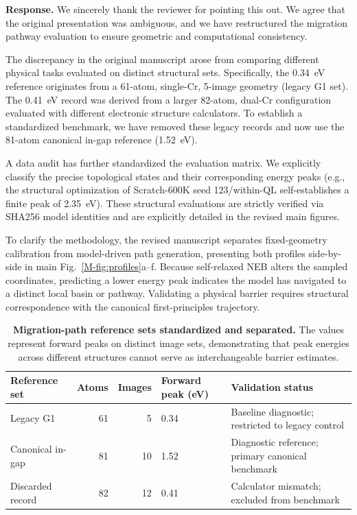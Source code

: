 \documentclass[11pt]{article}
\begin{document}
\textbf{Response.} 
We sincerely thank the reviewer for pointing this out. We agree that the original presentation was ambiguous, and we have restructured the migration pathway evaluation to ensure geometric and computational consistency. 

The discrepancy in the original manuscript arose from comparing different physical tasks evaluated on distinct structural sets. Specifically, the 0.34~eV reference originates from a 61-atom, single-Cr, 5-image geometry (legacy G1 set). The 0.41~eV record was derived from a larger 82-atom, dual-Cr configuration evaluated with different electronic structure calculators. To establish a standardized benchmark, we have removed these legacy records and now use the 81-atom canonical in-gap reference (1.52~eV).

A data audit has further standardized the evaluation matrix. We explicitly classify the precise topological states and their corresponding energy peaks (e.g., the structural optimization of Scratch-600K seed 123/within-QL self-establishes a finite peak of 2.35~eV). These structural evaluations are strictly verified via SHA256 model identities and are explicitly detailed in the revised main figures.

To clarify the methodology, the revised manuscript separates fixed-geometry calibration from model-driven path generation, presenting both profiles side-by-side in main Fig.~\ref{M-fig:profiles}a--f. Because self-relaxed NEB alters the sampled coordinates, predicting a lower energy peak indicates the model has navigated to a distinct local basin or pathway. Validating a physical barrier requires structural correspondence with the canonical first-principles trajectory.

\begin{table}[!htbp]
\centering\small
\caption{\textbf{Migration-path reference sets standardized and separated.} The values represent forward peaks on distinct image sets, demonstrating that peak energies across different structures cannot serve as interchangeable barrier estimates.}
\label{tab:resp-a1-reference-sets}
\setlength{\tabcolsep}{3pt}
\begin{tabular}{lrrll}
\toprule
Reference set & Atoms & Images & Forward peak (eV) & Validation status \\
\midrule
Legacy G1 & 61 & 5 & 0.34 & Baseline diagnostic; restricted to legacy control \\
Canonical in-gap & 81 & 10 & 1.52 & Diagnostic reference; primary canonical benchmark \\
Discarded record & 82 & 12 & 0.41 & Calculator mismatch; excluded from benchmark \\
\bottomrule
\end{tabular}
\end{table}
\end{document}
